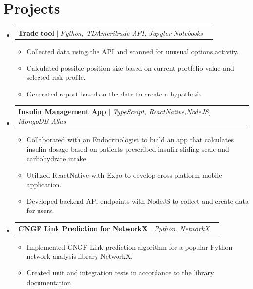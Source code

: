 \documentclass[letterpaper,11pt]{article}
\makeatletter
\newcommand{\resumeItem}[1]{
  \item\small{
    {#1 \vspace{-2pt}}
  }
}
\newcommand{\resumeProjectHeading}[2]{
    \item
    \begin{tabular*}{0.97\textwidth}{l@{\extracolsep{\fill}}r}
      \small#1 & #2 \\
    \end{tabular*}\vspace{-7pt}
}
\newcommand{\resumeSubHeadingListStart}{\begin{itemize}[leftmargin=0.15in, label={}]}
\newcommand{\resumeSubHeadingListEnd}{\end{itemize}}
\newcommand{\resumeItemListStart}{\begin{itemize}}
\newcommand{\resumeItemListEnd}{\end{itemize}\vspace{-5pt}}
\makeatother
\begin{document}
\section{Projects}
    
    \resumeSubHeadingListStart
      \resumeProjectHeading
          {\textbf{Trade tool } $|$ \emph{Python, TDAmeritrade API, Jupyter Notebooks}}{}%
          \resumeItemListStart
            \resumeItem{Collected data using the API and scanned for unusual options activity.  }
            \resumeItem{Calculated possible position size based on current portfolio value and selected risk profile. }
            \resumeItem{Generated report based on the data to create a hypothesis. }
            
          \resumeItemListEnd
          \resumeProjectHeading
          {\textbf{Insulin Management App } $|$ \emph{TypeScript, ReactNative,NodeJS, MongoDB Atlas}}{}%
          \resumeItemListStart
            \resumeItem{Collaborated with an Endocrinologist to build an app that calculates insulin dosage based on patients prescribed insulin sliding scale and carbohydrate intake.  }
            \resumeItem{Utilized ReactNative with Expo to develop cross-platform mobile application. }
            \resumeItem{Developed backend API endpoints with NodeJS to collect and create data for users.}
            
          \resumeItemListEnd
          \resumeProjectHeading
          {\textbf{CNGF Link Prediction for NetworkX } $|$ \emph{Python, NetworkX }}{}%
          \resumeItemListStart
            \resumeItem{Implemented CNGF Link prediction algorithm for a popular Python network analysis library NetworkX.  }
            \resumeItem{Created unit and integration tests in accordance to the library documentation.}
            
            
          \resumeItemListEnd
      
    \resumeSubHeadingListEnd
    
{}{}{}
%
\end{document}
